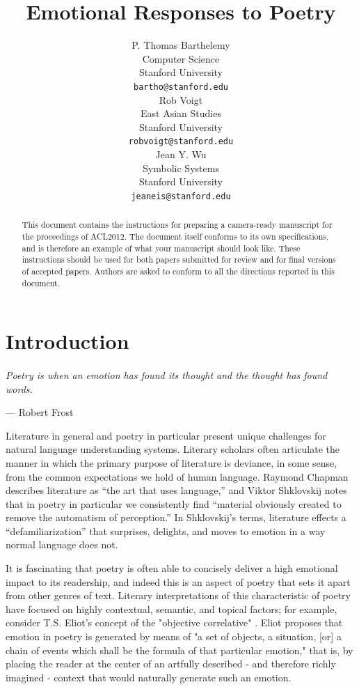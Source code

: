 \documentclass[11pt]{article}
\title{Emotional Responses to Poetry}
\author{P. Thomas Barthelemy \\
  Computer Science\\
  Stanford University \\
  {\tt bartho@stanford.edu} \\\And
  Rob Voigt \\
  East Asian Studies \\
  Stanford University \\
  {\tt robvoigt@stanford.edu} \\\And
  Jean Y. Wu \\
  Symbolic Systems  \\
  Stanford University\\
  {\tt jeaneis@stanford.edu} \\}
\date{}
\begin{document}
\maketitle
\begin{abstract}
  This document contains the instructions for preparing a camera-ready manuscript for the proceedings of ACL2012. The document itself conforms to its own specifications, and is therefore an example of what your manuscript should look like. These instructions should be used for both papers submitted for review and for final versions of accepted papers. Authors are asked to conform to all the directions reported in this document.
\end{abstract}

\section{Introduction}

\paragraph{}
\emph{Poetry is when an emotion has found its thought and the thought has found words.}
\begin{flushright}
--- Robert Frost\\
\end{flushright}


Literature in general and poetry in particular present unique challenges for natural language understanding systems. Literary scholars often articulate the manner in which the primary purpose of literature is deviance, in some sense, from the common expectations we hold of human language. Raymond Chapman describes literature as ``the art that uses language,'' and Viktor Shklovskij notes that in poetry in particular we consistently find ``material obviously created to remove the automatism of perception.'' In Shklovskij's terms, literature effects a ``defamiliarization'' that surprises, delights, and moves to emotion in a way normal language does not.

It is fascinating that poetry is often able to concisely deliver a high emotional impact to its readership, and indeed this is an aspect of poetry that sets it apart from other genres of text. Literary interpretations of this characteristic of poetry have focused on highly contextual, semantic, and topical factors; for example, consider T.S. Eliot's concept of the "objective correlative" \cite{eliot}. Eliot proposes that emotion in poetry is generated by means of "a set of objects, a situation, [or] a chain of events which shall be the formula of that particular emotion," that is, by placing the reader at the center of an artfully described - and therefore richly imagined - context that would naturally generate such an emotion.
\end{document}

